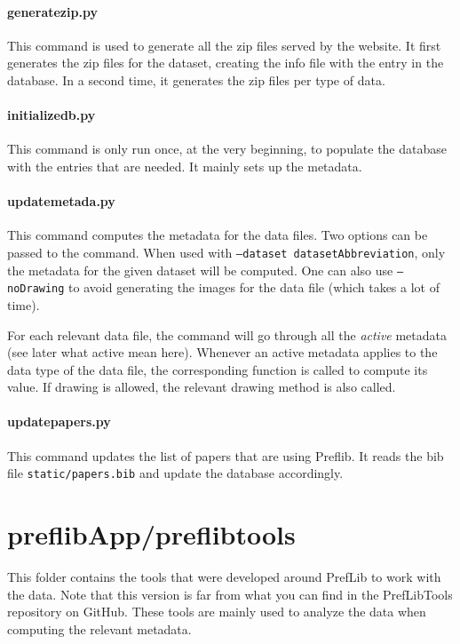 \documentclass{report}
\begin{document}
	\paragraph*{\faFileO{} generatezip.py} This command is used to generate all the zip files served by the website. It first generates the zip files for the dataset, creating the info file with the entry in the database. In a second time, it generates the zip files per type of data.
	
	\paragraph*{\faFileO{} initializedb.py} This command is only run once, at the very beginning, to populate the database with the entries that are needed. It mainly sets up the metadata.
	
	\paragraph*{\faFileO{} updatemetada.py} This command computes the metadata for the data files. Two options can be passed to the command. When used with \texttt{--dataset datasetAbbreviation}, only the metadata for the given dataset will be computed. One can also use \texttt{--noDrawing} to avoid generating the images for the data file (which takes a lot of time).
	
	For each relevant data file, the command will go through all the \emph{active} metadata (see later what active mean here). Whenever an active metadata applies to the data type of the data file, the corresponding function is called to compute its value. If drawing is allowed, the relevant drawing method is also called.
	
	\paragraph*{\faFileO{} updatepapers.py} This command updates the list of papers that are using Preflib. It reads the bib file \texttt{static/papers.bib} and update the database accordingly.
	
	\section*{\faFolderO{} preflibApp/preflibtools} This folder contains the tools that were developed around PrefLib to work with the data. Note that this version is far from what you can find in the PrefLibTools repository on GitHub. These tools are mainly used to analyze the data when computing the relevant metadata.
	
\end{document}

